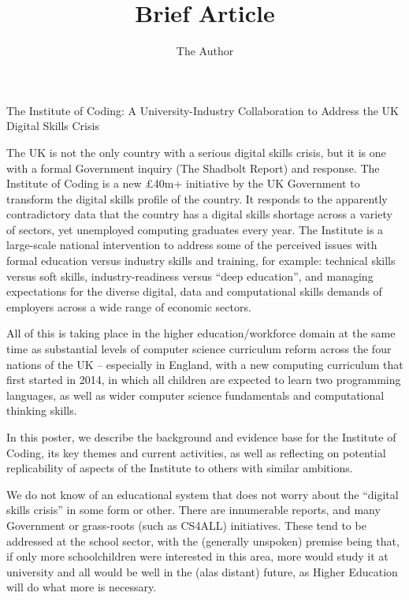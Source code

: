 \documentclass[11pt]{article} %
\title{Brief Article}
\author{The Author}
\begin{document}
{}

 
\noindent
The Institute of Coding: A University-Industry Collaboration to Address the UK Digital Skills Crisis

\noindent
The UK is not the only country with a serious digital skills crisis, but it is one with a formal Government inquiry (The Shadbolt Report) and response.
The Institute of Coding is a new \pounds40m+ initiative by the UK
Government to transform the digital skills profile of the country. It responds to the apparently contradictory data that
the country has a digital skills shortage across a variety of sectors,
yet unemployed computing graduates every year. The Institute is a
large-scale national intervention to address some of the perceived
issues with formal education versus industry skills and training, for
example: technical skills versus soft skills, industry-readiness
versus ``deep education'', and managing expectations for the diverse
digital, data and computational skills demands of employers across a
wide range of economic sectors.

All of this is taking place in the higher education/workforce domain
at the same time as substantial levels of computer science curriculum
reform across the four nations of the UK -- especially in England,
with a new computing curriculum that first started in 2014, in which
all children are expected to learn two programming languages, as well
as wider computer science fundamentals and computational thinking
skills.

In this poster, we describe the background and evidence base for the
Institute of Coding, its key themes and current activities, as
well as reflecting on potential replicability of aspects of the
Institute to others with similar ambitions.

\medskip
{}\noindent
We do not know of an educational system that does not worry about the ``digital skills crisis'' in some form or other. There are innumerable reports, and many Government or grass-roots (such as CS4ALL) initiatives.  These tend to be addressed at the school sector, with the (generally unspoken) premise being that, if only more schoolchildren were interested in this area, more would study it at university and all would be well in the (alas distant) future, as Higher Education will do what more is necessary.
\end{document}
